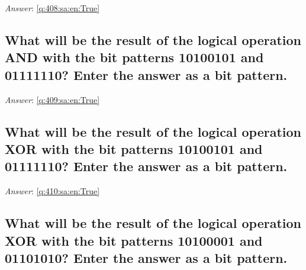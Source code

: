 \documentclass[a4paper,11pt,oneside]{article}
\begin{document}
\begin{sloppypar}
\label{q:408:sa:en:False}

\vspace{2cm}

\noindent\makebox[\textwidth]{\hrulefill}

\vspace{1cm}

\textit{Answer}: \autoref{q:408:sa:en:True}



\subsection{What will be the result of the logical operation AND with the bit patterns 10100101 and 01111110? Enter the answer as a bit pattern.}

\label{q:409:sa:en:False}

\vspace{2cm}

\noindent\makebox[\textwidth]{\hrulefill}

\vspace{1cm}

\textit{Answer}: \autoref{q:409:sa:en:True}



\subsection{What will be the result of the logical operation XOR with the bit patterns 10100101 and 01111110? Enter the answer as a bit pattern.}

\label{q:410:sa:en:False}

\vspace{2cm}

\noindent\makebox[\textwidth]{\hrulefill}

\vspace{1cm}

\textit{Answer}: \autoref{q:410:sa:en:True}



\subsection{What will be the result of the logical operation XOR with the bit patterns 10100001 and 01101010? Enter the answer as a bit pattern.}

\label{q:411:sa:en:False}

\vspace{2cm}

\noindent\makebox[\textwidth]{\hrulefill}


\end{sloppypar}
\end{document}

